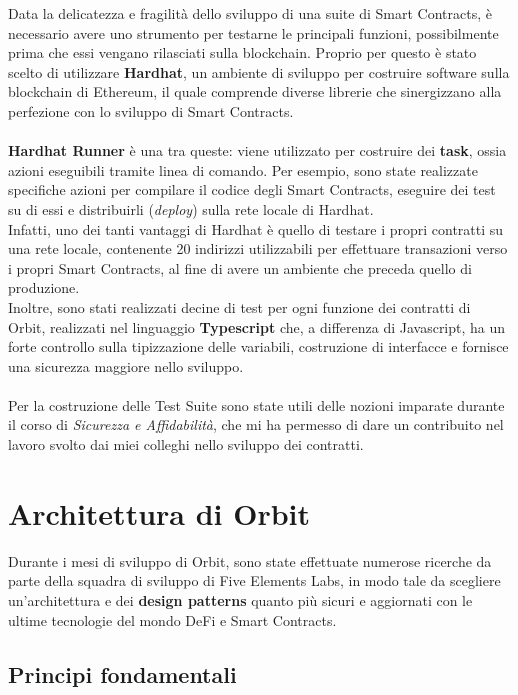 \documentclass[12pt,a4paper]{report}
\begin{document}
Data la delicatezza e fragilità dello sviluppo di una suite di Smart Contracts, è necessario avere uno strumento per testarne le principali funzioni, possibilmente prima che essi vengano rilasciati sulla blockchain. Proprio per questo è stato scelto di utilizzare \textbf{Hardhat}\cite{hardhat}, un ambiente di sviluppo per costruire software sulla blockchain di Ethereum, il quale comprende diverse librerie che sinergizzano alla perfezione con lo sviluppo di Smart Contracts.\\\\\textbf{Hardhat Runner} è una tra queste: viene utilizzato per costruire dei \textbf{task}, ossia azioni eseguibili tramite linea di comando.
Per esempio, sono state realizzate specifiche azioni per compilare il codice degli Smart Contracts, eseguire dei test su di essi e distribuirli (\textit{deploy}) sulla rete locale di Hardhat.
\\Infatti, uno dei tanti vantaggi di Hardhat è quello di testare i propri contratti su una rete locale, contenente 20 indirizzi utilizzabili per effettuare transazioni verso i propri Smart Contracts, al fine di avere un ambiente che preceda quello di produzione.
\\Inoltre, sono stati realizzati decine di test per ogni funzione dei contratti di Orbit, realizzati nel linguaggio \textbf{Typescript} che, a differenza di Javascript, ha un forte controllo sulla tipizzazione delle variabili, costruzione di interfacce e fornisce una sicurezza maggiore nello sviluppo.
\\\\Per la costruzione delle Test Suite sono state utili delle nozioni imparate durante il corso di \textit{Sicurezza e Affidabilità}, che mi ha permesso di dare un contribuito nel lavoro svolto dai miei colleghi nello sviluppo dei contratti.


\chapter{Architettura di Orbit}

Durante i mesi di sviluppo di Orbit, sono state effettuate numerose ricerche da parte della squadra di sviluppo di Five Elements Labs, in modo tale da scegliere un'architettura e dei \textbf{design patterns} quanto più sicuri e aggiornati con le ultime tecnologie del mondo DeFi e Smart Contracts.

\section{Principi fondamentali}
\end{document}

